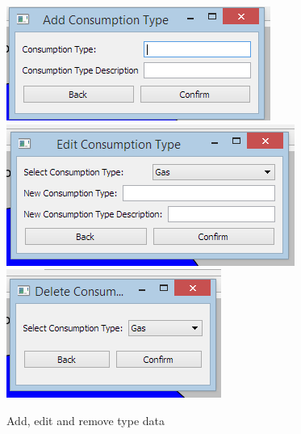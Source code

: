 \begin{figure}[H]
	\includegraphics{./maintenance/images/UI_Add_Type.png}
	\includegraphics{./maintenance/images/UI_Edit_Type.png}
	\includegraphics{./maintenance/images/UI_Remove_Type.png}
	\caption{Add, edit and remove type data}
\end{figure}

